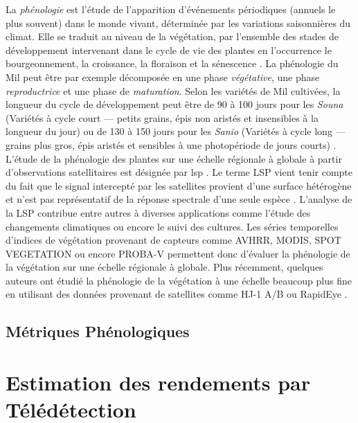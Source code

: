 La \emph{phénologie} 
est l’étude de l’apparition d’événements périodiques (annuels le plus souvent) dans le monde vivant, déterminée par les variations saisonnières du climat. Elle se traduit au niveau de 
la végétation, par l’ensemble des stades de développement intervenant dans le cycle de vie des plantes en l’occurrence le bourgeonnement, la croissance, la floraison et la 
sénescence \citep{Kimball2014}. La phénologie du Mil peut être par exemple décomposée en une phase \emph{végétative}, une phase \emph{reproductrice} et une phase de 
\emph{maturation}. Selon les variétés de Mil cultivées, la longueur du cycle de développement peut être de 90 à 100 jours pour les \emph{Souna} (Variétés à cycle court --- 
petits grains, épis non aristés et insensibles à la longueur du jour) ou de 130 à 150 jours pour les \emph{Sanio} (Variétés à cycle long --- grains plus gros, épis aristés et sensibles
à une photopériode de jours courts) \citep{Diouf2001}.
\\L'\'etude de la phénologie des plantes sur une échelle régionale à globale à partir d’observations satellitaires est désignée par \acrfull{lsp} \citep{Helman2018}. Le terme LSP 
vient tenir compte du fait que le signal intercepté par les satellites provient d’une surface hétérogène et n’est pas représentatif de la réponse spectrale d’une seule espèce 
\citep{Kimball2014}. L'analyse de la LSP contribue entre autres à diverses applications comme l’étude des changements climatiques \citep{Begue2014} ou encore le suivi des
cultures. Les séries temporelles d’indices de végétation provenant de capteurs comme AVHRR, MODIS, SPOT VEGETATION ou encore PROBA-V permettent donc d’évaluer la phénologie de la 
végétation sur une échelle régionale à globale. Plus récemment, quelques auteurs ont étudié la phénologie de la végétation à une échelle beaucoup plus fine en utilisant des données
provenant de satellites comme HJ-1 A/B \citep{Pan2015} ou RapidEye \citep{Vrieling2017}.

  \subsection{Métriques Phénologiques}

 

\section{Estimation des rendements par Télédétection}